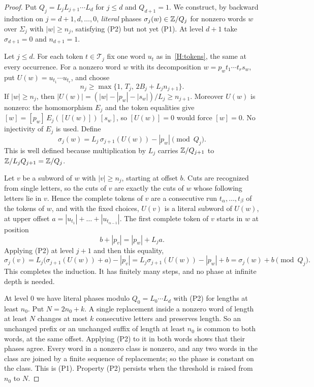 \begin{proof}
Put $Q_j=L_jL_{j+1}\cdots L_d$ for $j\leq d$ and $Q_{d+1}=1$. We construct, by backward induction on $j=d+1,d,\dots,0$,
\emph{literal} phases $\sigma_j(w)\in\mathbb Z/Q_j$ for nonzero words $w$ over $\Sigma_j$ with $|w|\geq n_j$, satisfying (P2) but
not yet (P1). At level $d+1$ take $\sigma_{d+1}=0$ and $n_{d+1}=1$.

Let $j\leq d$. For each token $t\in\mathcal T_j$ fix one word $u_t$ as in~\ref{H:tokens}, the same at every
occurrence. For a nonzero word $w$ with its decomposition
$w=p_wt_1\cdots t_rs_w$, put $U(w)=u_{t_1}\cdots u_{t_r}$, and choose
\[
 n_j\geq\max\{1,\,T_j,\,2B_j+L_jn_{j+1}\}.
\]
If $|w|\geq n_j$, then $|U(w)|=(|w|-|p_w|-|s_w|)/L_j\geq n_{j+1}$. Moreover $U(w)$ is nonzero: the homomorphism $E_j$
and the token equalities give $[w]=[p_w]\,E_j([U(w)])\,[s_w]$, so $[U(w)]=0$ would force $[w]=0$. No injectivity of $E_j$
is used. Define
\[
 \sigma_j(w)=L_j\,\sigma_{j+1}(U(w))-|p_w|\pmod{Q_j}.
\]
This is well defined because multiplication by $L_j$ carries $\mathbb Z/Q_{j+1}$ to $\mathbb Z/L_jQ_{j+1}=\mathbb Z/Q_j$.

Let $v$ be a subword of $w$ with $|v|\geq n_j$, starting at offset $b$. Cuts are recognized from single letters, so the
cuts of $v$ are exactly the cuts of $w$ whose following letters lie in $v$. Hence the complete tokens of $v$ are a
consecutive run $t_\alpha,\dots,t_\beta$ of the tokens of $w$, and with the fixed choices, $U(v)$ is a literal subword of
$U(w)$, at upper offset $a=|u_{t_1}|+\dots+|u_{t_{\alpha-1}}|$. The first complete token of $v$ starts in $w$ at position
\[
 b+|p_v|=|p_w|+L_ja.
\]
Applying (P2) at level $j+1$ and then this equality,
\[
 \sigma_j(v)=L_j\bigl(\sigma_{j+1}(U(w))+a\bigr)-|p_v|=L_j\sigma_{j+1}(U(w))-|p_w|+b=\sigma_j(w)+b\pmod{Q_j}.
\]
This completes the induction. It has finitely many steps, and no phase at infinite depth is needed.

At level $0$ we have literal phases modulo $Q_0=L_0\cdots L_d$ with (P2) for lengths at least $n_0$. Put $N=2n_0+k$.
A single replacement inside a nonzero word of length at least $N$ changes at most $k$ consecutive letters and preserves
length. So an unchanged prefix or an unchanged suffix of length at least $n_0$ is common to both words, at the same
offset. Applying (P2) to it in both words shows that their phases agree. Every word in a nonzero class is nonzero, and
any two words in the class are joined by a finite sequence of replacements; so the phase is constant on the class. This
is (P1). Property (P2) persists when the threshold is raised from $n_0$ to $N$.
\end{proof}

